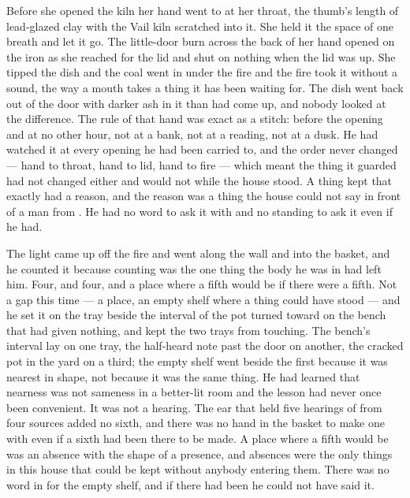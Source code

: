Before she opened the kiln her hand went to  at her throat, the thumb's length of lead-glazed clay with the Vail kiln scratched into it. She held it the space of one breath and let it go. The little-door burn across the back of her hand opened on the iron as she reached for the lid and shut on nothing when the lid was up. She tipped the dish and the coal went in under the fire and the fire took it without a sound, the way a mouth takes a thing it has been waiting for. The dish went back out of the door with darker ash in it than had come up, and nobody looked at the difference. The rule of that hand was exact as a stitch: before the opening and at no other hour, not at a bank, not at a reading, not at a dusk. He had watched it at every opening he had been carried to, and the order never changed --- hand to throat, hand to lid, hand to fire --- which meant the thing it guarded had not changed either and would not while the house stood. A thing kept that exactly had a reason, and the reason was a thing the house could not say in front of a man from . He had no word to ask it with and no standing to ask it even if he had.

The light came up off the fire and went along the wall and into the basket, and he counted it because counting was the one thing the body he was in had left him. Four, and four, and a place where a fifth would be if there were a fifth. Not a gap this time --- a place, an empty shelf where a thing could have stood --- and he set it on the tray beside the interval of the pot turned toward on the bench that had given nothing, and kept the two trays from touching. The bench's interval lay on one tray, the half-heard note past the door on another, the cracked pot in the yard on a third; the empty shelf went beside the first because it was nearest in shape, not because it was the same thing. He had learned that nearness was not sameness in a better-lit room and the lesson had never once been convenient. It was not a hearing. The ear that held five hearings of  from four sources added no sixth, and there was no hand in the basket to make one with even if a sixth had been there to be made. A place where a fifth would be was an absence with the shape of a presence, and absences were the only things in this house that could be kept without anybody entering them. There was no word in  for the empty shelf, and if there had been he could not have said it.

